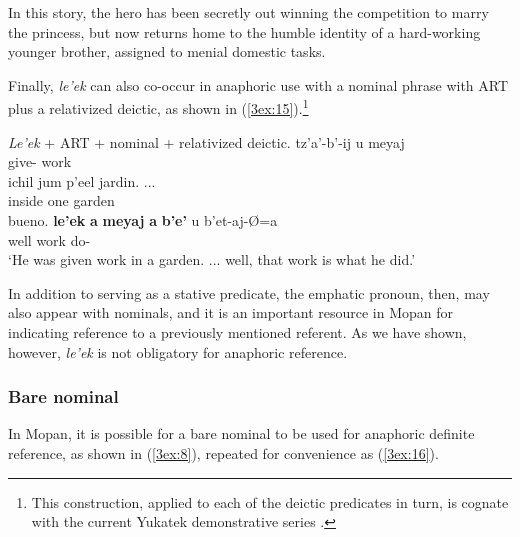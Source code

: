 \documentclass[output=paper]{langsci/langscibook}
\begin{document}
In this story, the hero has been secretly out winning the competition to marry the princess, but now returns home to the humble identity of a hard-working younger brother, assigned to menial domestic tasks.

Finally, {\emph{le'ek}} can also co-occur in anaphoric use with a nominal phrase with ART plus a relativized deictic, as shown in (\ref{3ex:15}).\footnote{This construction, applied to each of the deictic predicates in turn, is cognate with the current Yukatek demonstrative series \citep{hanks:90}.}

\filbreak
\begin{exe}
\ex\label{3ex:15}
{\emph{Le'ek}} + ART + nominal + relativized deictic.  
\exi{}
\gll	tz'a'-b'-ij	 				u 		meyaj	 \\
	give-{}		{}	work	\\
\glt
\exi{}
\gll	ichil 		jum	p'eel 		jardin. ... \\
	inside	one	{}	garden \\
\glt
\exi{}
\gll	bueno. 	{\bf{le'ek}} 	{\bf{a}} 	{\bf{meyaj}} 	{\bf{a}}	{\bf{b'e'}} 		u 		b'et-aj-\O=a  \\
	well		{}	{\sc{art}}	work			{}	{}	{}	do-{} \\
\glt	`He was given work in a garden. ... well, that work is what he did.'
\end{exe}

In addition to serving as a stative predicate, the emphatic pronoun, then, may also appear with nominals, and it is an important resource in Mopan for indicating reference to a previously mentioned referent. As we have shown, however, {\emph{le'ek}} is not obligatory for anaphoric reference.


\subsubsection{Bare nominal}\label{3sec:314}

In Mopan, it is possible for a bare nominal to be used for anaphoric definite reference, as shown in (\ref{3ex:8}), repeated for convenience as (\ref{3ex:16}).
\end{document}
